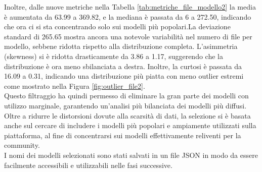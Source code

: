 \documentclass{article}
\begin{document}
Inoltre, dalle nuove metriche nella Tabella \ref{tab:metriche_file_modello2} la media è aumentata da 63.99 a 369.82, e la mediana è passata da 6 a 272.50, indicando che ora ci si sta concentrando solo sui modelli più popolari.La deviazione standard di 265.65 mostra ancora una notevole variabilità nel numero di file per modello, sebbene ridotta rispetto alla distribuzione completa. L’asimmetria (skewness) si è ridotta drasticamente da 3.86 a 1.17, suggerendo che la distribuzione è ora meno sbilanciata a destra. Inoltre, la curtosi è passata da 16.09 a 0.31, indicando una distribuzione più piatta con meno outlier estremi come mostrato nella Figura \ref{fig:outlier_file2}.\\
Questo filtraggio ha quindi permesso di eliminare la gran parte dei modelli con utilizzo marginale, garantendo un'analisi più bilanciata dei modelli più diffusi.
Oltre a ridurre le distorsioni dovute alla scarsità di dati, la selezione si è basata anche sul cercare di includere i modelli più popolari e ampiamente utilizzati sulla piattaforma, al fine di concentrarsi sui modelli effettivamente reliventi per la community.\\
I nomi dei modelli selezionati sono stati salvati in un file JSON in modo da essere facilmente accessibili e utilizzabili nelle fasi successive.
\end{document}
